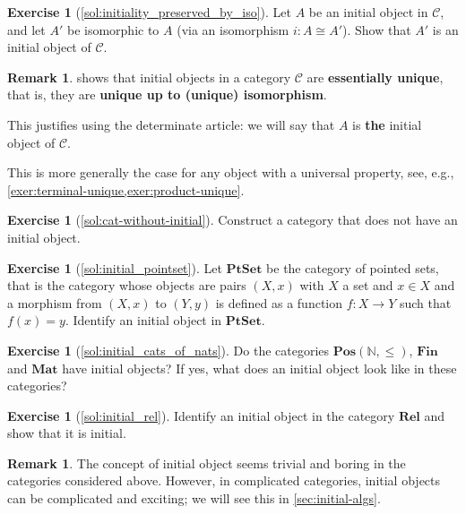 \documentclass[a4paper,11pt, oneside,titlepage=false]{scrbook}
\theoremstyle{plain}
\theoremstyle{definition}
\newtheorem{rem}[thm]{Remark}
\newtheorem{exer}[thm]{Exercise}
\newcommand{\Cat}[1]{\mathcal{#1}}
\newcommand{\CC}{\Cat{C}}
\newcommand{\Catb}[1]{\mathbf{#1}}
\newcommand{\PTSET}{\Catb{PtSet}}
\newcommand{\POS}{\Catb{Pos}}
\newcommand{\MAT}{\Catb{Mat}}
\newcommand{\SKELFINSET}{\Catb{Fin}}
\newcommand{\REL}{\Catb{Rel}}
\newcommand{\NN}{\ensuremath{\mathbb{N}}}
\begin{document}
\begin{exer}[\cref{sol:initiality_preserved_by_iso}]\label{exer:initiality_preserved_by_iso}
  Let $A$ be an initial object in $\CC$, and let $A'$ be isomorphic to $A$ (via an isomorphism $i : A \cong A'$).
  Show that $A'$ is an initial object of $\CC$.
\end{exer}

\begin{rem}
   shows that initial objects in a category $\CC$ are \textbf{essentially unique}, that is, they are \textbf{unique up to (unique) isomorphism}.

  
  This justifies using the determinate article: we will say that $A$ is \textbf{the} initial object of $\CC$.

  
  This is more generally the case for any object with a universal property, see, e.g., \cref{exer:terminal-unique,exer:product-unique}.
\end{rem}

\begin{exer}[\cref{sol:cat-without-initial}]\label{exer:cat-without-initial}
  Construct a category that does not have an initial object.
\end{exer}

\begin{exer}[\cref{sol:initial_pointset}]\label{exer:initial_pointset} Let $\PTSET$ be the category of pointed sets, that is the category whose objects are pairs $(X,x)$ with $X$ a set and $x\in X$ and a morphism from $(X,x)$ to $(Y,y)$ is defined as a function $f:X\to Y$ such that $f(x)=y$. Identify an initial object in $\PTSET$.
\end{exer}

\begin{exer}[\cref{sol:initial_cats_of_nats}]\label{exer:initial_cats_of_nats}
Do the categories $\POS(\NN, \leq)$, $\SKELFINSET$ and $\MAT$ have initial objects? If yes, what does an initial object look like in these categories?
\end{exer}

\begin{exer}[\cref{sol:initial_rel}] \label{exer:initial_rel}
Identify an initial object in the category $\REL$ and show that it is initial.
\end{exer}

\begin{rem}
  The concept of initial object seems trivial and boring in the categories considered above.
  However, in complicated categories, initial objects can be complicated and exciting;
  we will see this in \cref{sec:initial-algs}.
\end{rem}
\end{document}
